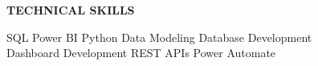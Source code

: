 \textbf{TECHNICAL SKILLS}

SQL\certsep
Power BI\certsep
Python\certsep
Data Modeling\certsep
Database Development
\\
Dashboard Development\certsep
REST APIs\certsep
Power Automate